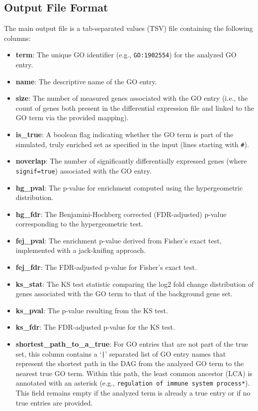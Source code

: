\documentclass{article}
\begin{document}
    \subsection{Output File Format}\label{subsec:output-file-format}
    The main output file is a tab-separated values (TSV) file containing the following columns:
    \begin{itemize}
        \item \textbf{term}: The unique GO identifier (e.g., \texttt{GO:1902554}) for the analyzed GO entry.
        \item \textbf{name}: The descriptive name of the GO entry.
        \item \textbf{size}: The number of measured genes associated with the GO entry (i.e., the count of genes both present in the differential expression file and linked to the GO term via the provided mapping).
        \item \textbf{is\_true}: A boolean flag indicating whether the GO term is part of the simulated, truly enriched set as specified in the input (lines starting with \texttt{\#}).
        \item \textbf{noverlap}: The number of significantly differentially expressed genes (where \texttt{signif=true}) associated with the GO entry.
        \item \textbf{hg\_pval}: The p-value for enrichment computed using the hypergeometric distribution.
        \item \textbf{hg\_fdr}: The Benjamini-Hochberg corrected (FDR-adjusted) p-value corresponding to the hypergeometric test.
        \item \textbf{fej\_pval}: The enrichment p-value derived from Fisher’s exact test, implemented with a jack-knifing approach.
        \item \textbf{fej\_fdr}: The FDR-adjusted p-value for Fisher’s exact test.
        \item \textbf{ks\_stat}: The KS test statistic comparing the log2 fold change distribution of genes associated with the GO term to that of the background gene set.
        \item \textbf{ks\_pval}: The p-value resulting from the KS test.
        \item \textbf{ks\_fdr}: The FDR-adjusted p-value for the KS test.
        \item \textbf{shortest\_path\_to\_a\_true}: For GO entries that are not part of the true set, this column contains a ‘\texttt{|}’ separated list of GO entry names that represent the shortest path in the DAG from the analyzed GO term to the nearest true GO term. Within this path, the least common ancestor (LCA) is annotated with an asterisk (e.g., \texttt{regulation of immune system process*}). This field remains empty if the analyzed term is already a true entry or if no true entries are provided.
    \end{itemize}
\end{document}
